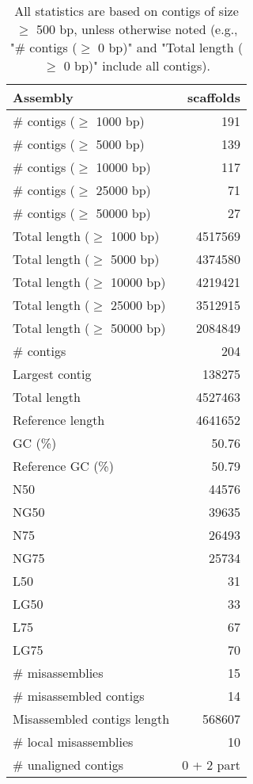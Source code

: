 \documentclass[12pt,a4paper]{article}
\begin{document}
\begin{table}[ht]
\begin{center}
\caption{All statistics are based on contigs of size $\geq$ 500 bp, unless otherwise noted (e.g., "\# contigs ($\geq$ 0 bp)" and "Total length ($\geq$ 0 bp)" include all contigs).}
\begin{tabular}{|l*{1}{|r}|}
\hline
Assembly & scaffolds \\ \hline
\# contigs ($\geq$ 1000 bp) & 191 \\ \hline
\# contigs ($\geq$ 5000 bp) & 139 \\ \hline
\# contigs ($\geq$ 10000 bp) & 117 \\ \hline
\# contigs ($\geq$ 25000 bp) & 71 \\ \hline
\# contigs ($\geq$ 50000 bp) & 27 \\ \hline
Total length ($\geq$ 1000 bp) & 4517569 \\ \hline
Total length ($\geq$ 5000 bp) & 4374580 \\ \hline
Total length ($\geq$ 10000 bp) & 4219421 \\ \hline
Total length ($\geq$ 25000 bp) & 3512915 \\ \hline
Total length ($\geq$ 50000 bp) & 2084849 \\ \hline
\# contigs & 204 \\ \hline
Largest contig & 138275 \\ \hline
Total length & 4527463 \\ \hline
Reference length & 4641652 \\ \hline
GC (\%) & 50.76 \\ \hline
Reference GC (\%) & 50.79 \\ \hline
N50 & 44576 \\ \hline
NG50 & 39635 \\ \hline
N75 & 26493 \\ \hline
NG75 & 25734 \\ \hline
L50 & 31 \\ \hline
LG50 & 33 \\ \hline
L75 & 67 \\ \hline
LG75 & 70 \\ \hline
\# misassemblies & 15 \\ \hline
\# misassembled contigs & 14 \\ \hline
Misassembled contigs length & 568607 \\ \hline
\# local misassemblies & 10 \\ \hline
\# unaligned contigs & 0 + 2 part \\ \hline

\end{tabular}
\end{center}
\end{table}
\end{document}
